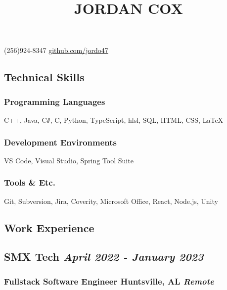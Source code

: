 \documentclass{article}
\begin{document}
\title{\vspace*{-4em}\textbf{JORDAN COX}}
\author{}
\date{}

\maketitle

\begin{center}
    \vspace*{-6em}
    (256)924-8347  \url{github.com/jordo47}
\end{center}

\subsection*{Technical Skills}
\subsubsection*{\hspace*{0.15cm} Programming Languages}
\hspace*{0.5cm} C++, Java, C\verb|#|, C, Python, TypeScript, hlsl, SQL, HTML, CSS, {\LaTeX}

\subsubsection*{\hspace*{0.15cm} Development Environments}
\hspace*{0.5cm} VS Code, Visual Studio, Spring Tool Suite

\subsubsection*{\hspace*{0.15cm} Tools \& Etc.}
\hspace*{0.5cm} Git, Subversion, Jira, Coverity, Microsoft Office, React, Node.js, Unity


\subsection*{Work Experience}

\subsection*{\hspace*{0.15cm} SMX Tech \hfill \textit{April 2022 - January 2023}}
\subsubsection*{\hspace*{0.15cm} Fullstack Software Engineer \hfill Huntsville, AL \textit{Remote}}
\end{document}
